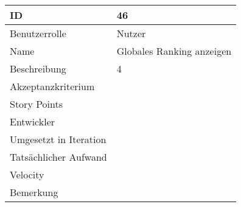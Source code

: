 \begin{tabularx}{\textwidth}{|p{}|X|}
	\hline
	ID & 46\\
	\hline
	Benutzerrolle & Nutzer\\
	\hline
	Name & Globales Ranking anzeigen\\
	\hline
	Beschreibung & 4\\
	\hline
	Akzeptanzkriterium & \\
	\hline
	Story Points & \\
	\hline
	Entwickler & \\
	\hline
	Umgesetzt in Iteration & \\ 
	\hline
	Tatsächlicher Aufwand & \\
	\hline
	Velocity & \\
	\hline
	Bemerkung & \\
	\hline
\end{tabularx}
\vspace{20pt}
